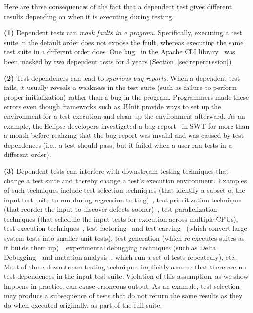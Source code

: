 Here are three consequences of the fact that a dependent
test gives different results depending on when it is executing
during testing.

\textbf{(1)}
Dependent tests can
\emph{mask faults in a program}. Specifically, executing a test suite in the
default order does not expose the fault, whereas
executing the same test suite in a different order does. 
One bug~\cite{clibug} in the Apache CLI library~\cite{cli}
was been masked by two dependent tests
for 3 years (Section~\ref{sec:repercussion}).

\textbf{(2)}
Test dependences can lead to \emph{spurious bug reports}.
When a dependent test fails, it usually reveals a weakness in the test
suite (such as failure to perform proper initialization) rather than a bug
in the program.
Programmers made these errors even though frameworks such as
JUnit provide ways to set up the environment for a test execution and clean
up the environment afterward.
%
As an example, the Eclipse developers
investigated a bug report~\cite{eclipsebug} in SWT for
more than a month before realizing that the 
bug report was invalid and was caused by test dependences
(i.e., a test should pass, but it failed when a user
ran tests in a different order).
%



\textbf{(3)}
Dependent tests can interfere with downstream testing
techniques that change a test suite and thereby change a test's execution environment.
Examples of such techniques include
test selection techniques (that identify a subset of
the input test suite to run during
regression testing)~\cite{harroldetal:OOPSLA:2001},
test prioritization techniques (that reorder the
input to discover defects sooner)~\cite{Elbaum:2000:PTC:347324.348910},
test parallelization techniques (that schedule the input tests for execution across multiple
CPUs), test execution techniques~\cite{Misailovic:2007, SPLAT},
test factoring~\cite{Saff:2005} and test carving~\cite{Elbaum:2006} (which
convert large system tests into smaller unit tests),
test generation (which re-executes suites as it builds them up)~\cite{PachecoE2005,RobinsonEPAL2011},
experimental debugging techniques (such as Delta
Debugging~\cite{Zeller:2002} and mutation analysis~\cite{Schuler:2009:EMT},
which run a set of tests repeatedly), etc. 
Most of these downstream testing techniques implicitly assume that
there are no test dependences in the input test suite. Violation of
this assumption, as we show happens in practice, can cause erroneous
output.  As an
example, test selection may produce a subsequence of tests that do not
return the same results as they do when executed originally, as part of the full suite.


